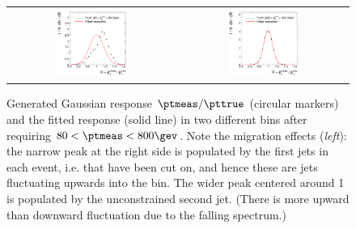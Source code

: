 \begin{figure}[ht]
  \centering
  \begin{tabular}{cc}
    \includegraphics[width=0.45\textwidth]{figures/resFit_ToyMC_PtCuts_ResolutionBin1} &
    \includegraphics[width=0.45\textwidth]{figures/resFit_ToyMC_PtCuts_ResolutionBin7} \\
  \end{tabular}
  \caption{Generated Gaussian response \mbox{$\ptmeas / \pttrue$}
    (circular markers) and the fitted
    response (solid line) in two different \pttrue bins after
    requiring \mbox{$80 < \ptmeas < 800\gev$}.
    Note the migration effects (\textit{left}): the narrow peak at the
    right side is populated by the first jets in each event, i.e. that have been cut on, and hence these are jets fluctuating upwards into the \pt bin.
    The wider peak centered around 1 is populated by the unconstrained
    second jet.
    (There is more upward than downward fluctuation due to the falling
    \pttrue spectrum.)
  }
  \label{fig:ResFit:ToyMC:PtCuts:Response}
\end{figure}

